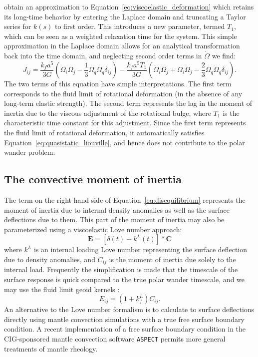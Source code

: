 \documentclass[preprint,12pt,authoryear]{elsarticle}
\begin{document}
\citet{ricard1993polar} obtain an approximation to Equation~\eqref{eq:viscoelastic_deformation} which retains its long-time behavior by entering the Laplace domain and truncating a Taylor series for $k(s)$ to first order.  
This introduces a new parameter, termed $T_1$, which can be seen as a weighted relaxation time for the system.  
This simple approximation in the Laplace domain allows for an analytical transformation back into the time domain, and neglecting second order terms in $\dot{\Omega}$ we find:
\begin{equation}
J_{ij} = \frac{k_f a^5}{3 G} \left( \Omega_i \Omega_j - \frac{1}{3} \Omega_q \Omega_q \delta_{ij} \right) -
 \frac{k_f a^5 T_1}{3G} \left(\dot{\Omega}_i \Omega_j + \Omega_i \dot{\Omega}_j - \frac{2}{3} \Omega_q \dot{\Omega}_q \delta_{ij} \right).
\label{eq:rotational_deformation}
\end{equation}
The two terms of this equation have simple interpretations.  
The first term corresponds to the fluid limit of rotational deformation (in the absence of any long-term elastic strength).  
The second term represents the lag in the moment of inertia due to the viscous adjustment of the rotational bulge, where $T_1$ is the characteristic time constant for this adjustment.
Since the first term represents the fluid limit of rotational deformation, it automatically satisfies Equation~\eqref{eq:quasistatic_liouville}, and hence does not contribute to the polar wander problem.

\subsection{The convective moment of inertia}
\label{sec:convective_moment}

The term on the right-hand side of Equation~\eqref{eq:disequilibrium} represents the moment of inertia due to internal density anomalies as well as the surface deflections due to them.
This part of the moment of inertia may also be parameterized using a viscoelastic Love number approach:
\begin{equation} 
\mathbf{E} = \left[ \delta(t) + k^L(t) \right] * \mathbf{C}
\end{equation}
where $k^L$ is an internal loading Love number representing the surface deflection due to density anomalies, 
and $C_{ij}$ is the moment of inertia due solely to the internal load.
Frequently the simplification is made that the timescale of the surface response is quick compared to the true polar wander timescale, and we may use the fluid limit geoid kernels \citep[e.g.][]{richards1984geoid}:  
\begin{equation}
E_{ij} = (1+k^L_f) C_{ij}.
\end{equation}
An alternative to the Love number formalism is to calculate to surface deflections directly using mantle convection simulations with a true free surface boundary condition.
A recent implementation of a free surface boundary condition in the CIG-sponsored mantle convection software \texttt{ASPECT} \citep{rose2016free}
permits more general treatments of mantle rheology.
\end{document}
